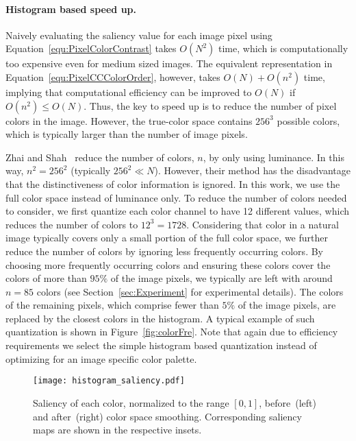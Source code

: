 \documentclass[10pt,twocolumn,letterpaper]{article}
\newcommand{\figref}[1]{Figure~\ref{#1}}
\newcommand{\equref}[1]{Equation~\ref{#1}}
\newcommand{\secref}[1]{Section~\ref{#1}}
\newcommand{\vnudge}{\vspace*{-.1in}}
\newcommand{\mypara}[1]{\paragraph{#1.}}
\begin{document}
\vnudge
\mypara{Histogram based speed up} Naively evaluating the saliency value for each image
pixel using \equref{equ:PixelColorContrast} takes $O(N^2)$ time, which is
computationally too expensive even for medium sized images.
%
The equivalent representation in \equref{equ:PixelCCColorOrder}, however, takes $O(N) + O(n^2)$ time,
implying that computational efficiency can be improved to $O(N)$ if $O(n^2) \leq O(N)$.
%
Thus, the key to speed up is to reduce the number of pixel colors in the image.
However, the true-color space contains $256^3$ possible colors,
which is typically larger than the number of image pixels.


Zhai and Shah~\cite{06acmmm/ZhaiS_spatiotemporal} reduce the number of colors, $n$,
by only using luminance. In this way, $n^2=256^2$ (typically $256^2 \ll N$).
However, their method has the disadvantage that the distinctiveness of color information is ignored.
%
In this work, we use the full color space instead of luminance only.
To reduce the number of colors needed to consider, we first quantize each color channel to have 12 different values,
which reduces the number of colors to $12^3=1728$.
%
Considering that color in a natural image typically covers only a small portion of the full color space,
we further reduce the number of colors by ignoring less frequently occurring colors.
%
By choosing more frequently occurring colors and ensuring these colors cover the colors of more
than $95\%$ of the image pixels, we typically are left with around $n=85$ colors (see
\secref{sec:Experiment} for experimental details).
%
The colors of the remaining pixels, which comprise fewer than $5\%$ of the image pixels,
are replaced by the closest colors in the histogram. A typical example of such
quantization is shown in \figref{fig:colorFre}.
%
Note that again due to efficiency requirements we select the simple histogram based quantization
instead of optimizing for an image specific color palette.


\begin{figure}
    \centering
    \texttt{[image: histogram\_saliency.pdf]}
    \caption{Saliency of each color, normalized to the range $[0,1]$,
        before~(left) and after~(right) color space smoothing.
        Corresponding saliency maps are shown in the respective insets.
    }\label{fig:HCSmoothing} \vnudge
\end{figure}
\end{document}
